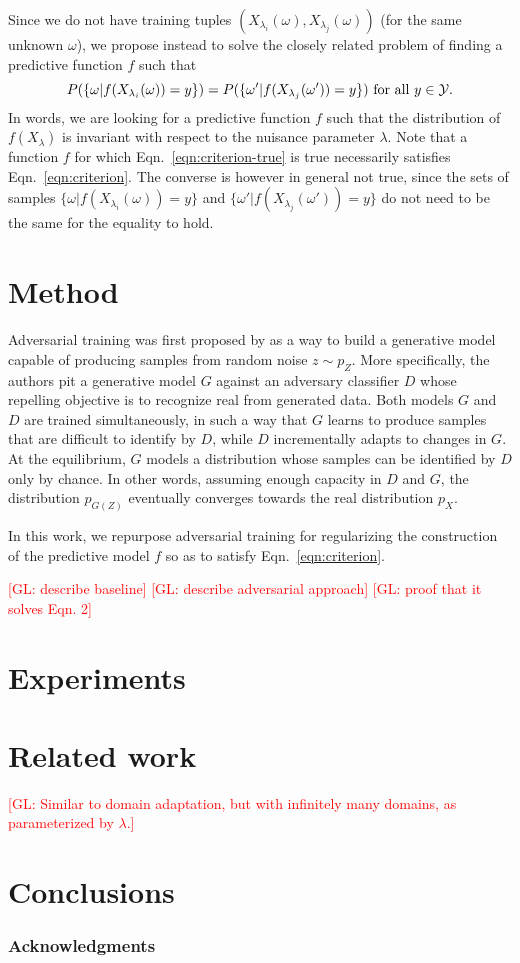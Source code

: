 \documentclass{article}
\newcommand{\glnote}[1]{\textcolor{red}{[GL: #1]}}
\theoremstyle{plain}
\begin{document}
Since we do not have training tuples $(X_{\lambda_i}(\omega),
X_{\lambda_j}(\omega))$ (for the same unknown $\omega$), we propose instead to
solve the closely related problem of finding a predictive function $f$ such that
\begin{equation}\label{eqn:criterion}
    P(\{ \omega | f(X_{\lambda_i}(\omega)) = y \} ) = P( \{ \omega' | f(X_{\lambda_j}(\omega')) = y\}) \text{ for all $y \in {\cal Y}$}.
\end{equation}
In words, we are looking for a predictive function $f$ such that  the
distribution of $f(X_\lambda)$ is invariant with respect to the nuisance
parameter $\lambda$. Note that a function $f$ for which Eqn.~\ref{eqn:criterion-true} is
true necessarily satisfies Eqn.~\ref{eqn:criterion}. The converse is however in
general not true, since the sets of samples $\{ \omega | f(X_{\lambda_i}(\omega)) = y \}$
and $\{ \omega' | f(X_{\lambda_j}(\omega')) = y \}$ do not need to be the same
for the equality to hold.


\section{Method}
\label{sec:method}

Adversarial training was first proposed by \cite{goodfellow2014generative} as a
way to build a generative model capable of producing samples from random noise
$z \sim p_Z$. More specifically, the authors pit a generative model $G$ against
an adversary classifier $D$ whose repelling objective is to recognize real from
generated data. Both models $G$ and $D$ are trained simultaneously, in such a
way that $G$ learns to produce samples that are difficult to identify by $D$,
while $D$ incrementally adapts to changes in $G$. At the equilibrium, $G$ models
a distribution whose samples can be identified by $D$ only by chance. In other
words, assuming enough capacity in $D$ and  $G$, the distribution $p_{G(Z)}$
eventually converges towards the real distribution $p_X$.

In this work, we repurpose adversarial training for regularizing the
construction of the predictive model $f$ so as to satisfy
Eqn.~\ref{eqn:criterion}.

\glnote{describe baseline}
\glnote{describe adversarial approach}
\glnote{proof that it solves Eqn. 2}

\section{Experiments}

\section{Related work}

\glnote{Similar to domain adaptation, but with infinitely many domains,
as parameterized by $\lambda$.}

\section{Conclusions}

\subsubsection*{Acknowledgments}


{\small
}
\end{document}
